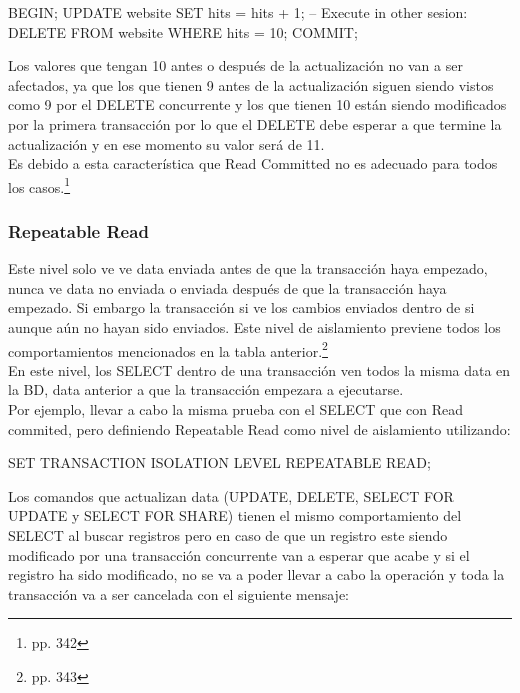 \begin{pyglist}
BEGIN;
UPDATE website SET hits = hits + 1;
-- Execute in other sesion: DELETE FROM website WHERE hits = 10;
COMMIT;
\end{pyglist}

Los valores que tengan 10 antes o después de la actualización no van a ser afectados, ya que los que tienen 9 antes de la actualización siguen siendo vistos como 9 por el DELETE concurrente y los que tienen 10 están siendo modificados por la primera transacción por lo que el DELETE debe esperar a que termine la actualización y en ese momento su valor será de 11.\\

Es debido a esta característica que Read Committed no es adecuado para todos los casos.\footnote{\cite{Group2013} pp. 342}

\subsubsection{Repeatable Read}

Este nivel solo ve ve data enviada antes de que la transacción haya empezado, nunca ve data no enviada o enviada después de que la transacción haya empezado. Si embargo la transacción si ve los cambios enviados dentro de si aunque aún no hayan sido enviados. Este nivel de aislamiento previene todos los comportamientos mencionados en la tabla anterior.\footnote{\cite{Group2013} pp. 343}\\

En este nivel, los SELECT dentro de una transacción ven todos la misma data en la BD, data anterior a que la transacción empezara a ejecutarse.\\

Por ejemplo, llevar a cabo la misma prueba con el SELECT que con Read commited, pero definiendo Repeatable Read como nivel de aislamiento utilizando:\\

\begin{pyglist}
SET TRANSACTION ISOLATION LEVEL REPEATABLE READ;
\end{pyglist}

Los comandos que actualizan data (UPDATE, DELETE, SELECT FOR UPDATE y SELECT FOR SHARE) tienen el mismo comportamiento del SELECT al buscar registros pero en caso de que un registro este siendo modificado por una transacción concurrente van a esperar que acabe y si el registro ha sido modificado, no se va a poder llevar a cabo la operación y toda la transacción va a ser cancelada con el siguiente mensaje:\\

